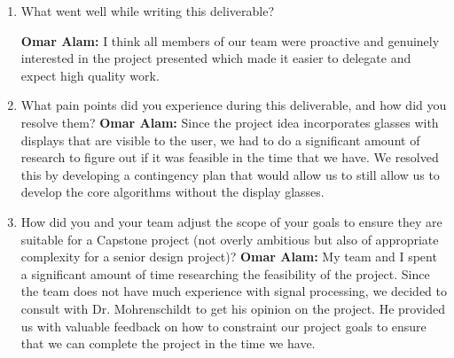 \documentclass{article}
\begin{document}
\begin{enumerate}
    \item What went well while writing this deliverable? 
    
    \textbf{Omar Alam:} I think all members of our team were proactive and genuinely interested in the project presented which made it easier
    to delegate and expect high quality work. 
    \item What pain points did you experience during this deliverable, and how
    did you resolve them?
    \textbf{Omar Alam:} Since the project idea incorporates glasses with displays that are visible to the user, we had to do a significant amount
    of research to figure out if it was feasible in the time that we have. We resolved this by developing a contingency plan that would allow us to 
    still allow us to develop the core algorithms without the display glasses.
    \item How did you and your team adjust the scope of your goals to ensure
    they are suitable for a Capstone project (not overly ambitious but also of
    appropriate complexity for a senior design project)?
    \textbf{Omar Alam:} My team and I spent a significant amount of time researching the feasibility of the project. Since the team does not have much
    experience with signal processing, we decided to consult with Dr. Mohrenschildt to get his opinion on the project. He provided us with valuable feedback on how
    to constraint our project goals to ensure that we can complete the project in the time we have.
\end{enumerate}  



\end{document}
